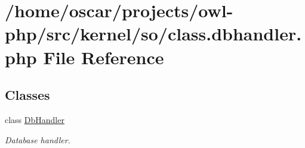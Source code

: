 \section{/home/oscar/projects/owl-\/php/src/kernel/so/class.dbhandler.php File Reference}
\label{class_8dbhandler_8php}
\subsection*{Classes}
\begin{DoxyCompactItemize}
\item 
class \hyperlink{classDbHandler}{DbHandler}
\begin{DoxyCompactList}\small\item\em Database handler. \item\end{DoxyCompactList}\end{DoxyCompactItemize}
